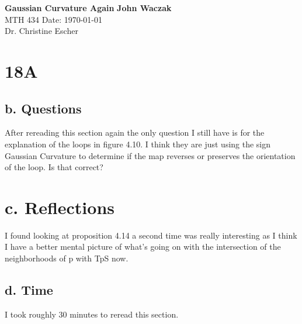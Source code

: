 \documentclass[a4paper, 11pt]{article}
\begin{document}
\noindent
\large\textbf{Gaussian Curvature Again} \hfill \textbf{John Waczak} \\
\normalsize MTH 434 \hfill  Date: \today \\
Dr. Christine Escher \\

\section*{18A}
	\subsection*{b. Questions}
	After rereading this section again the only question I still have is for the explanation of the loops in figure 4.10. I think they are just using the sign Gaussian Curvature to determine if the map reverses or preserves the orientation of the loop. Is that correct?  
	
	\section*{c. Reflections}
	I found looking at proposition 4.14 a second time was really interesting as I think I have a better mental picture of what's going on with the intersection of the neighborhoods of p with TpS now. 
	\subsection*{d. Time}
	I took roughly 30 minutes to reread this section. 
\end{document}
